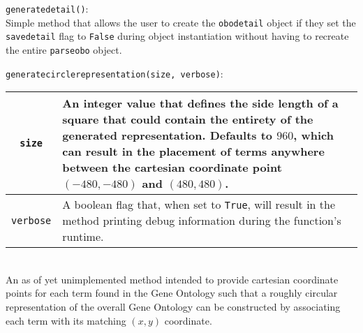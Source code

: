 \documentclass[10pt,a4paper,notitlepage]{article}
\newcommand\ttscore[0]{\underline{\hspace{0.2cm}}}
\begin{document}
\smallskip

\texttt{generate\ttscore detail()}:\\
Simple method that allows the user to create the \texttt{obo\ttscore detail} object if they set the \texttt{save\ttscore detail} flag to \texttt{False} during object instantiation without having to recreate the entire \texttt{parse\ttscore obo} object.

\smallskip

\texttt{generate\ttscore circle\ttscore representation(size, verbose)}:

\noindent \begin{tabular}{|c|p{5.4in}|} \hline
  \texttt{size} &
  An integer value that defines the side length of a square that could contain the entirety of the generated representation. Defaults to $960$, which can result in the placement of terms anywhere between the cartesian coordinate point $(-480,-480)$ and $(480,480)$. \\ \hline
  \texttt{verbose} &
  A boolean flag that, when set to \texttt{True}, will result in the method printing debug information during the function's runtime. \\ \hline
\end{tabular}\\
An as of yet unimplemented method intended to provide cartesian coordinate points for each term found in the Gene Ontology such that a roughly circular representation of the overall Gene Ontology can be constructed by associating each term with its matching $(x,y)$ coordinate.
\end{document}
